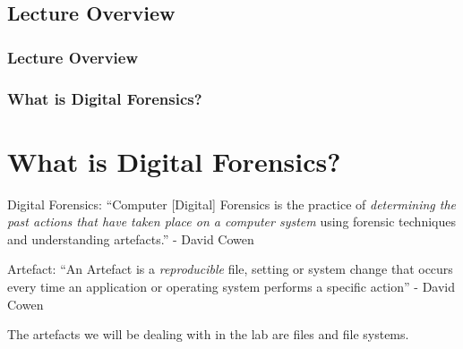 \documentclass{beamer}
\begin{document}
\begin{frame}
\section*{Lecture Overview}
\frametitle{Lecture Overview}
\tableofcontents
\end{frame}

\begin{frame}
	\frametitle{What is Digital Forensics?}
	\section{What is Digital Forensics?}
	\begin{block}{Digital Forensics:}
		``Computer [Digital] Forensics is the practice of \textit{determining the past actions that have taken place on a computer system} using forensic techniques and understanding artefacts.'' - David Cowen
	\end{block}
		
	\begin{block}{Artefact:}
		``An Artefact is a \textit{reproducible} file, setting or system change that occurs every time an application or operating system performs a specific action'' - David Cowen
	\end{block}

	The artefacts we will be dealing with in the lab are files and file systems.
\end{frame}
\end{document}

